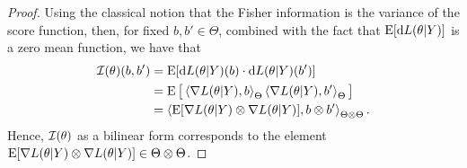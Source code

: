 \begin{proof}
Using the classical notion that the Fisher information is the variance of the score function, then, for fixed $b,b'\in\Theta$, combined with the fact that $\operatorname{E}[\text{d} L(\theta|Y)]$ is a zero mean function, we have that 
\begin{align*}
  {\mathcal I}(\theta)(b,b') 
  &= \operatorname{E} [ \text{d} L(\theta|Y)(b) \cdot \text{d} L(\theta|Y)(b') ] \\
  &= \operatorname{E} \big[ \left\langle \nabla L(\theta|Y) , b \right\rangle_\Theta \left\langle \nabla L(\theta|Y) , b' \right\rangle_\Theta \big] \\
  &= \left\langle \operatorname{E} [\nabla L(\theta|Y) \otimes \nabla L(\theta|Y)] , b \otimes b' \right\rangle_{\Theta\otimes\Theta}.
\end{align*}
Hence, ${\mathcal I}(\theta)$ as a bilinear form corresponds to the element $\operatorname{E} [\nabla L(\theta|Y) \otimes \nabla L(\theta|Y)] \in \Theta\otimes\Theta$.


\end{proof}
